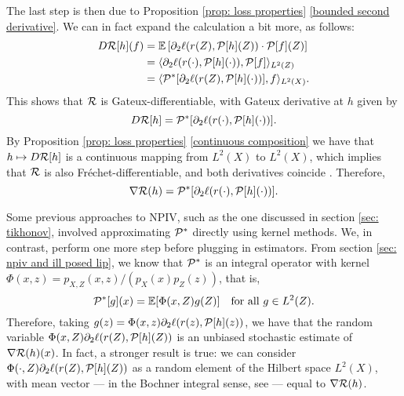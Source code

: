 The last step is then due to Proposition \ref{prop: loss properties} \ref{bounded second derivative}.
We can in fact expand the calculation a bit more, as follows:
\begin{align*}
    D \mathcal{R} [ h ] ( f )
    &= \mathbb{E} \left[
        \partial_{ 2 } \ell ( r ( Z ), \mathcal{P} [ h ] ( Z ) ) \cdot \mathcal{P} [ f ] ( Z )
    \right] \\
    &= \langle  \partial_{ 2 } \ell ( r ( \cdot ), \mathcal{P} [ h ] ( \cdot ) ), \mathcal{P} [ f ]  \rangle_{ L^{ 2 } ( Z ) } \\
    &= \langle  \mathcal{P}^{ * } [ \partial_{ 2 } \ell ( r ( Z ), \mathcal{P} [ h ] ( \cdot ) ) ], f  \rangle_{ L^{ 2 } ( X ) }
.\end{align*}
This shows that $ \mathcal{R} $ is Gateux-differentiable, with Gateux derivative at $ h $ given by
\begin{equation*}
    D \mathcal{R} [ h ] = \mathcal{P}^{ * } [ \partial_{ 2 } \ell ( r ( \cdot ), \mathcal{P} [ h ] ( \cdot ) ) ]
.\end{equation*}
By Proposition \ref{prop: loss properties} \ref{continuous composition} we have that $ h \mapsto D \mathcal{R} [ h ] $ is a continuous mapping from $ L^{ 2 } ( X ) $ to $ L^{ 2 } ( X ) $, which implies that $ \mathcal{R} $ is also Fréchet-differentiable, and both derivatives coincide \cite[Theorem~3.3]{pathak2018}.
Therefore,
\begin{equation}
    \label{eq: risk gradient}
   \nabla \mathcal{R} ( h ) = \mathcal{P}^{ * } [ \partial_{ 2 } \ell ( r ( \cdot ), \mathcal{P} [ h ] ( \cdot ) ) ]  
.\end{equation}

Some previous approaches to NPIV, such as the one discussed in section \ref{sec: tikhonov}, involved approximating $ \mathcal{P}^{ * } $ directly using kernel methods.
We, in contrast, perform one more step before plugging in estimators.
From section \ref{sec: npiv and ill posed lip}, we know that $ \mathcal{P}^{ * } $ is an integral operator with kernel $ \Phi ( x, z ) = p_{ X, Z } ( x, z ) / ( p_{ X } ( x ) p_{ Z } ( z ) ) $, that is,
\begin{equation*}
    \mathcal{P}^{ * } [ g ] ( x ) = \mathbb{E} [ \Phi ( x, Z ) g ( Z ) ] \quad \text{for all } g \in L^2 ( Z )
.\end{equation*}
Therefore, taking $ g ( z ) = \Phi ( x, z ) \partial_{ 2 } \ell ( r ( z ), \mathcal{P} [ h ] ( z ) ) $, we have that the random variable $ \Phi ( x, Z ) \partial_{ 2 } \ell ( r ( Z ), \mathcal{P} [ h ] ( Z ) ) $ is an unbiased stochastic estimate of $ \nabla \mathcal{R} ( h ) ( x ) $.
In fact, a stronger result is true: we can consider $ \Phi ( \cdot, Z ) \partial_{ 2 } \ell ( r ( Z ), \mathcal{P} [ h ] ( Z ) ) $ as a random element of the Hilbert space $ L^2 ( X ) $, with mean vector --- in the Bochner integral sense, see \cite[Chapter~7]{hsing2015} --- equal to $ \nabla \mathcal{R} ( h ) $.

